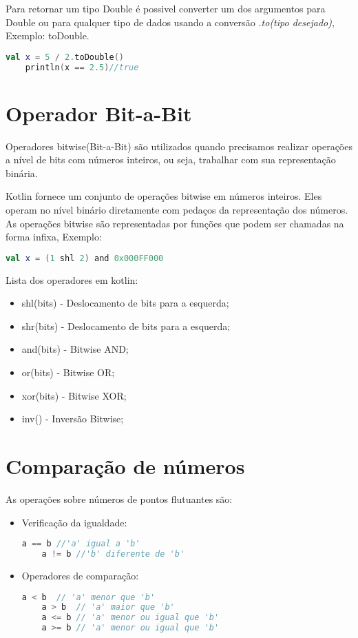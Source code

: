     Para retornar um tipo Double é possivel converter um dos argumentos para
    Double ou para qualquer tipo de dados usando a conversão \emph{.to(tipo desejado)}, Exemplo: toDouble.
    \begin{lstlisting}[label={lst:example1}, language=Kotlin]
    val x = 5 / 2.toDouble()
    println(x == 2.5)//true
    \end{lstlisting}

\section{Operador Bit-a-Bit}

Operadores bitwise(Bit-a-Bit) são utilizados quando precisamos realizar operações 
a nível de bits com números inteiros, ou seja, trabalhar com sua 
representação binária.

Kotlin fornece um conjunto de operações bitwise em números inteiros.
Eles operam no nível binário diretamente com pedaços da representação 
dos números. As operações bitwise são representadas por funções que 
podem ser chamadas na forma infixa, Exemplo:
\begin{lstlisting}[label={lst:example1}, language=Kotlin]
  val x = (1 shl 2) and 0x000FF000
\end{lstlisting}

Lista dos operadores em kotlin:

\begin{itemize}
	\item shl(bits) - Deslocamento de bits para a esquerda;
	\item shr(bits) - Deslocamento de bits para a esquerda;
	\item and(bits) - Bitwise AND;
	\item or(bits)  - Bitwise OR;
	\item xor(bits) - Bitwise XOR;
	\item inv()     - Inversão Bitwise;
\end{itemize}

\section{Comparação de números}

As operações sobre números de pontos flutuantes são:


\begin{itemize}
\item
  Verificação da igualdade:  
  \begin{lstlisting}[label={lst:example1}, language=Kotlin]
    a == b //'a' igual a 'b'
    a != b //'b' diferente de 'b'
  \end{lstlisting}

  \item
  Operadores de comparação:  
  \begin{lstlisting}[label={lst:example1}, language=Kotlin]
    a < b  // 'a' menor que 'b' 
    a > b  // 'a' maior que 'b'
    a <= b // 'a' menor ou igual que 'b'
    a >= b // 'a' menor ou igual que 'b'
  \end{lstlisting}
\end{itemize}


